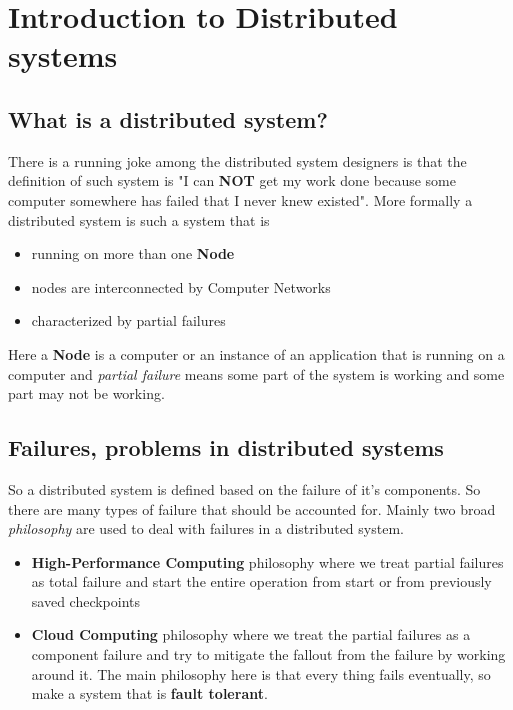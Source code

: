 \chapter{Introduction to Distributed systems}

\section{What is a distributed system?}
There is a running joke among the distributed system designers is that the definition of such system is "I can \textbf{NOT} get my work done because some computer somewhere has failed that I never knew existed". More formally a distributed system is such a system that is

\begin{itemize}
    \item running on more than one \textbf{Node}
    \item nodes are interconnected by Computer Networks
    \item characterized by partial failures
\end{itemize}

\noindent Here a \textbf{Node} is a computer or an instance of an application that is running on a computer and \textit{partial failure} means some part of the system is working and some part may not be working.

\section{Failures, problems in distributed systems}

\noindent So a distributed system is defined based on the failure of it's components. So there are many types of failure that should be accounted for. Mainly two broad \textit{philosophy} are used to deal with failures in a distributed system.

\begin{itemize}
    \item \textbf{High-Performance Computing} philosophy where we treat partial failures as total failure and start the entire operation from start or from previously saved checkpoints
    \item \textbf{Cloud Computing} philosophy where we treat the partial failures as a component failure and try to mitigate the fallout from the failure by working around it. The main philosophy here is that every thing fails eventually, so make a system that is \textbf{fault tolerant}.
\end{itemize}

